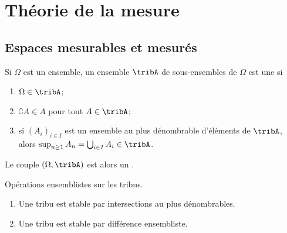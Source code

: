 

\section{Théorie de la mesure}

\subsection{Espaces mesurables et mesurés}

\begin{definition}  \label{DefjRsGSy}
    Si \( \Omega\) est un ensemble, un ensemble \( \tribA\) de sous-ensembles de \( \Omega\) est une  si 
    \begin{enumerate}
        \item
            \( \Omega\in\tribA\);
        \item
            \( \complement A\in A\) pour tout \( A\in\tribA\);
        \item
            si \( (A_i)_{i\in I}\) est un ensemble au plus dénombrable d'éléments de \( \tribA\), alors \( \sup_{n\geq 1}A_n=\bigcup_{i\in I}A_i\in\tribA\).
    \end{enumerate}
    Le couple \( (\Omega,\tribA)\) est alors un .
\end{definition}

\begin{lemma}   \label{LemBWNlKfA}
    Opérations ensemblistes sur les tribus.
    \begin{enumerate}
        \item
    Une tribu est stable par intersections au plus dénombrables.
\item
    Une tribu est stable par différence ensembliste.
    \end{enumerate}
\end{lemma}

